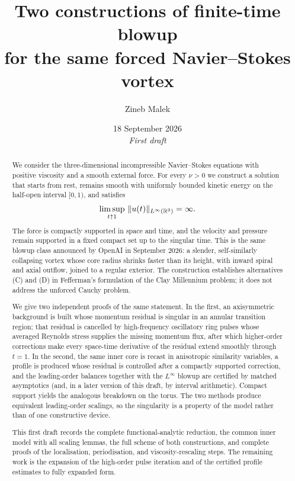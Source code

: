\documentclass[11pt,a4paper]{amsart}
\title[Two constructions of forced Navier--Stokes blowup]{Two constructions of finite-time blowup\\ for the same forced {N}avier--{S}tokes vortex}
\author{Zineb Malek}
\date{18 September 2026\\[0.4em]\textit{First draft}}
\theoremstyle{plain}
\theoremstyle{definition}
\theoremstyle{remark}
\numberwithin{equation}{section}
\begin{document}
\begin{abstract}
We consider the three-dimensional incompressible {N}avier--{S}tokes equations with positive viscosity and a smooth external force. For every $\nu>0$ we construct a solution that starts from rest, remains smooth with uniformly bounded kinetic energy on the half-open interval $[0,1)$, and satisfies
\[
\limsup_{t\uparrow 1}\,\|u(t)\|_{L^\infty(\mathbb{R}^3)}=\infty.
\]
The force is compactly supported in space and time, and the velocity and pressure remain supported in a fixed compact set up to the singular time. This is the same blowup class announced by {O}pen{AI} in September 2026: a slender, self-similarly collapsing vortex whose core radius shrinks faster than its height, with inward spiral and axial outflow, joined to a regular exterior. The construction establishes alternatives (C) and (D) in {F}efferman's formulation of the {C}lay {M}illennium problem; it does not address the unforced Cauchy problem.

We give two independent proofs of the same statement. In the first, an axisymmetric background is built whose momentum residual is singular in an annular transition region; that residual is cancelled by high-frequency oscillatory ring pulses whose averaged {R}eynolds stress supplies the missing momentum flux, after which higher-order corrections make every space-time derivative of the residual extend smoothly through $t=1$. In the second, the same inner core is recast in anisotropic similarity variables, a profile is produced whose residual is controlled after a compactly supported correction, and the leading-order balances together with the $L^\infty$ blowup are certified by matched asymptotics (and, in a later version of this draft, by interval arithmetic). Compact support yields the analogous breakdown on the torus. The two methods produce equivalent leading-order scalings, so the singularity is a property of the model rather than of one constructive device.

This first draft records the complete functional-analytic reduction, the common inner model with all scaling lemmas, the full scheme of both constructions, and complete proofs of the localisation, periodisation, and viscosity-rescaling steps. The remaining work is the expansion of the high-order pulse iteration and of the certified profile estimates to fully expanded form.
\end{abstract}

\maketitle

\tableofcontents












\end{document}
